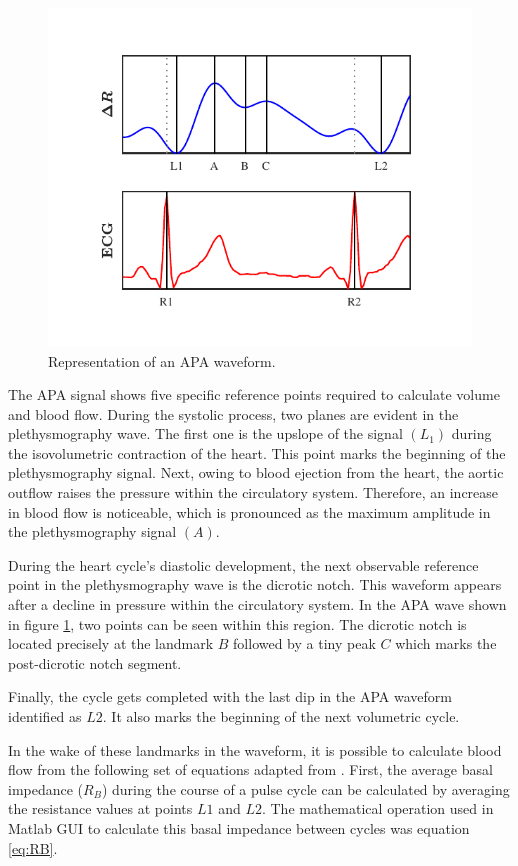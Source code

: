 \begin{figure}[!htpb]
	\centering
	\includegraphics[width=12cm,keepaspectratio]{figure5}
	\caption{Representation of an APA waveform.}
	\label{fig:markers APA}
\end{figure}

The APA signal shows five specific reference points required to calculate volume and blood flow. During the systolic process, two planes are evident in the plethysmography wave. The first one is the upslope of the signal $(L_{1})$ during the isovolumetric contraction of the heart. This point marks the beginning of the plethysmography signal. Next, owing to blood ejection from the heart, the aortic outflow raises the pressure within the circulatory system. Therefore, an increase in blood flow is noticeable, which is pronounced as the maximum amplitude in the plethysmography signal $(A)$. 

During the heart cycle's diastolic development, the next observable reference point in the plethysmography wave is the dicrotic notch. This waveform appears after a decline in pressure within the circulatory system. In the APA wave shown in figure \ref{fig:markers APA}, two points can be seen within this region. The dicrotic notch is located precisely at the landmark $B$ followed by a tiny peak $C$ which marks the post-dicrotic notch segment. 

Finally, the cycle gets completed with the last dip in the APA waveform identified as $L2$. It also marks the beginning of the next volumetric cycle. 

In the wake of these landmarks in the waveform, it is possible to calculate blood flow from the following set of equations adapted from \cite{montgomery2011segmental}. First, the average basal impedance ($R_B$) during the course of a pulse cycle can be calculated by averaging the resistance values at points $L1$ and $L2$. The mathematical operation used in Matlab GUI to calculate this basal impedance between cycles was equation \ref{eq:RB}.

